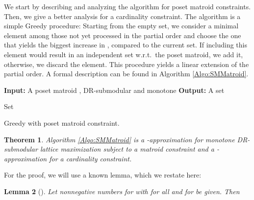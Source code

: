 \documentclass{article}
\theoremstyle{plain}
\newtheorem{theorem}{Theorem}
\newtheorem{lemma}[theorem]{Lemma}
\theoremstyle{definition}
\begin{document}
We start by describing and analyzing the algorithm for poset matroid constraints. 
Then, we give a better analysis for a cardinality constraint. 
The algorithm is a simple Greedy procedure: Starting from the empty set, 
we consider a minimal element among those not yet processed in the partial order
and choose the one that yields the biggest increase in , compared to the current set. 
If including this element would result in an independent set w.r.t.\ the poset matroid, 
we add it, otherwise, we discard the element. This procedure yields a linear extension  of the partial order. 
A formal description can be found in Algorithm \ref{Algo:SMMatroid}. 

\begin{algorithm2e}
\DontPrintSemicolon
\textbf{Input:} A poset matroid ,  DR-submodular and monotone\;
\textbf{Output:} A set \;


 Set \; 
 \caption{Greedy with poset matroid constraint.}\label{Algo:SMMatroid}
\end{algorithm2e}

\begin{theorem}\label{thm:monotoneDRDLApprox}
Algorithm \ref{Algo:SMMatroid} is a -approximation for monotone DR-submodular lattice maximization subject to a matroid constraint
and a -approximation for a cardinality constraint.    
\end{theorem}

For the proof, we will use a known lemma, which we restate here: 

\begin{lemma}[\cite{FisherGreedyII}]\label{lemma:FisherArithmetic}
 Let nonnegative numbers  for  with  for all  and 
  for  be given. 
 Then 
\end{lemma}
\end{document}
